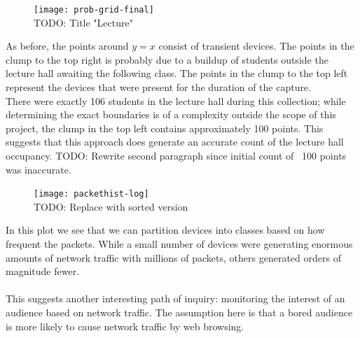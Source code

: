 \documentclass[letterpaper,abstract=on,titlepage=false]{scrreprt}
\begin{document}
	\begin{figure}[H]
		\texttt{[image: prob-grid-final]}
		\centering
		\\TODO: Title "Lecture"
	\end{figure}

	As before, the points around \(y=x\) consist of transient devices.
	The points in the clump to the top right is probably due to a buildup of students outside the lecture hall awaiting the following class.
	The points in the clump to the top left represent the devices that were present for the duration of the capture.
	\\
	There were exactly 106 students in the lecture hall during this collection; while determining the exact boundaries is of a complexity outside the scope of this project, the clump in the top left contains approximately 100 points.
	This suggests that this approach does generate an accurate count of the lecture hall occupancy.
    TODO: Rewrite second paragraph since initial count of ~100 points was inaccurate.

	\begin{figure}[H]
		\texttt{[image: packethist-log]}
		\centering
		\\TODO: Replace with sorted version
	\end{figure}

	In this plot we see that we can partition devices into classes based on how frequent the packets.
	While a small number of devices were generating enormous amounts of network traffic with millions of packets, others generated orders of magnitude fewer.
	\\\\
	This suggests another interesting path of inquiry: monitoring the interest of an audience based on network traffic.
	The assumption here is that a bored audience is more likely to cause network traffic by web browsing.
\end{document}
